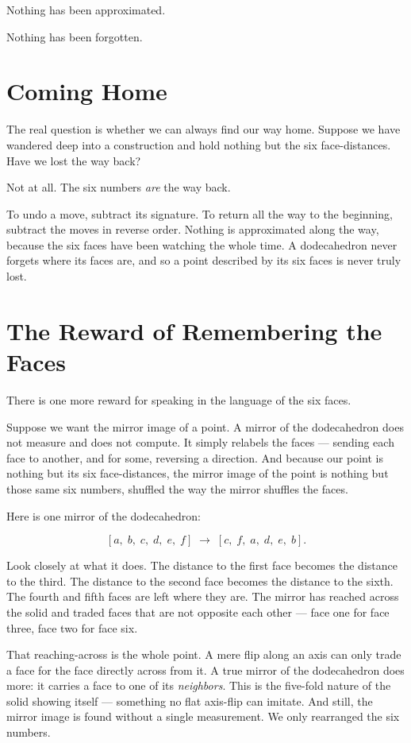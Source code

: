 Nothing has been approximated.

Nothing has been forgotten.

\section*{Coming Home}

The real question is whether we can always find our way home. Suppose we have wandered deep into a construction and hold nothing but the six face-distances. Have we lost the way back?

Not at all. The six numbers \emph{are} the way back.

To undo a move, subtract its signature. To return all the way to the beginning, subtract the moves in reverse order. Nothing is approximated along the way, because the six faces have been watching the whole time. A dodecahedron never forgets where its faces are, and so a point described by its six faces is never truly lost.

\section*{The Reward of Remembering the Faces}

There is one more reward for speaking in the language of the six faces.

Suppose we want the mirror image of a point. A mirror of the dodecahedron does not measure and does not compute. It simply relabels the faces --- sending each face to another, and for some, reversing a direction. And because our point is nothing but its six face-distances, the mirror image of the point is nothing but those same six numbers, shuffled the way the mirror shuffles the faces.

Here is one mirror of the dodecahedron:

\[
[a,\;b,\;c,\;d,\;e,\;f]
\;\longrightarrow\;
[c,\;f,\;a,\;d,\;e,\;b].
\]

Look closely at what it does. The distance to the first face becomes the distance to the third. The distance to the second face becomes the distance to the sixth. The fourth and fifth faces are left where they are. The mirror has reached across the solid and traded faces that are not opposite each other --- face one for face three, face two for face six.

That reaching-across is the whole point. A mere flip along an axis can only trade a face for the face directly across from it. A true mirror of the dodecahedron does more: it carries a face to one of its \emph{neighbors}. This is the five-fold nature of the solid showing itself --- something no flat axis-flip can imitate. And still, the mirror image is found without a single measurement. We only rearranged the six numbers.

